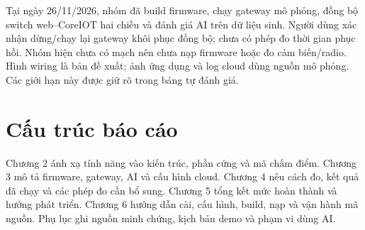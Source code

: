 Tại ngày 26/11/2026, nhóm đã build firmware, chạy gateway mô phỏng, đồng bộ switch web--CoreIOT hai chiều và đánh giá AI trên dữ liệu sinh. Người dùng xác nhận dừng/chạy lại gateway khôi phục đồng bộ; chưa có phép đo thời gian phục hồi. Nhóm hiện chưa có mạch nên chưa nạp firmware hoặc đo cảm biến/radio. Hình wiring là bản đề xuất; ảnh ứng dụng và log cloud dùng nguồn mô phỏng. Các giới hạn này được giữ rõ trong bảng tự đánh giá.

\section{Cấu trúc báo cáo}
Chương 2 ánh xạ tính năng vào kiến trúc, phần cứng và mã chấm điểm. Chương 3 mô tả firmware, gateway, AI và cấu hình cloud. Chương 4 nêu cách đo, kết quả đã chạy và các phép đo cần bổ sung. Chương 5 tổng kết mức hoàn thành và hướng phát triển. Chương 6 hướng dẫn cài, cấu hình, build, nạp và vận hành mã nguồn. Phụ lục ghi nguồn minh chứng, kịch bản demo và phạm vi dùng AI.

